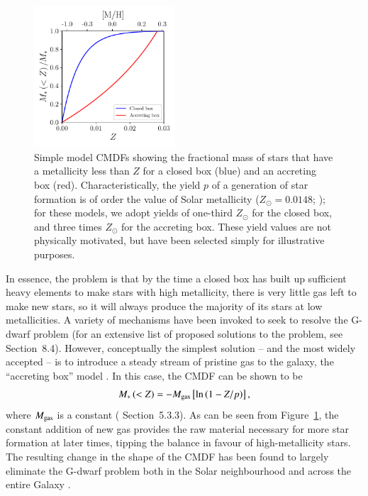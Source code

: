 \documentclass[fleqn,usenatbib]{mnras}
\begin{document}
\begin{figure}
	\includegraphics[width=0.47\textwidth]{Figures/Theoretical_MDFs.pdf}
    \caption{Simple model CMDFs showing the fractional mass of stars that have a metallicity less than $Z$ for a closed box (blue) and an accreting box (red). Characteristically, the yield $p$ of a generation of star formation is of order the value of Solar metallicity ($Z_{\odot} = 0.0148$; \citealp{Lodders2019SolarAbundances}); for these models, we adopt yields of one-third $Z_{\odot}$ for the closed box, and three times $Z_{\odot}$ for the accreting box. These yield values are not physically motivated, but have been selected simply for illustrative purposes.}
    \label{fig:Theoretical_MDFs}
\end{figure}

In essence, the problem is that by the time a closed box has built up sufficient heavy elements to make stars with high metallicity, there is very little gas left to make new stars, so it will always produce the majority of its stars at low metallicities. A variety of mechanisms have been invoked to seek to resolve the G-dwarf problem (for an extensive list of proposed solutions to the problem, see \citealp{Pagel2009NucleosynthesisGalaxies} Section~8.4). However, conceptually the simplest solution -- and the most widely accepted -- is to introduce a steady stream of pristine gas to the galaxy, the ``accreting box'' model \citep{Tinsley1974ConstraintsNeighborhood, Tinsley1980EvolutionGalaxies}. In this case, the CMDF can be shown to be 
\begin{equation}
    M_{*} \left( < Z \right) = -M_{\rm{gas}} \left[ \ln{ \left(1 - Z / p \right)} \right],
	\label{eq:accreting_box}
\end{equation}
where $M_{\rm{gas}}$ is a constant (\citealp{Binney1998GalacticAstronomy} Section~5.3.3). As can be seen from Figure~\ref{fig:Theoretical_MDFs}, the constant addition of new gas provides the raw material necessary for more star formation at later times, tipping the balance in favour of high-metallicity stars. The resulting change in the shape of the CMDF has been found to largely eliminate the G-dwarf problem both in the Solar neighbourhood \citep{Gratton1996TheNeighbourhood, Chiappini1996TheModel} and across the entire Galaxy \citep{Chiappini2001AbundanceWay, Hayden2015CHEMICALDISK}.
\end{document}
